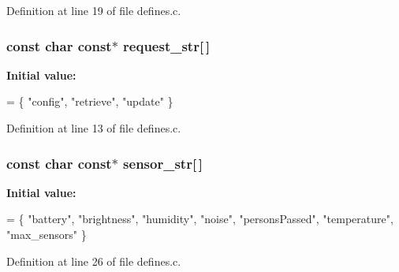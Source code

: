 Definition at line 19 of file defines.\-c.

\subsubsection[{request\-\_\-str}]{\setlength{\rightskip}{0pt plus 5cm}const char const$\ast$ request\-\_\-str[$\,$]}\label{defines_8c_a3a6251b9cae8d7da3cec393b23df3228}
{\bfseries Initial value\-:}
\begin{DoxyCode}
= \{
    \textcolor{stringliteral}{"config"},
    \textcolor{stringliteral}{"retrieve"},
    \textcolor{stringliteral}{"update"}
\}
\end{DoxyCode}


Definition at line 13 of file defines.\-c.

\subsubsection[{sensor\-\_\-str}]{\setlength{\rightskip}{0pt plus 5cm}const char const$\ast$ sensor\-\_\-str[$\,$]}\label{defines_8c_aa1c2df433b41481f1dee5aa6519df290}
{\bfseries Initial value\-:}
\begin{DoxyCode}
= \{
    \textcolor{stringliteral}{"battery"},
    \textcolor{stringliteral}{"brightness"},
    \textcolor{stringliteral}{"humidity"},
    \textcolor{stringliteral}{"noise"},
    \textcolor{stringliteral}{"personsPassed"},
    \textcolor{stringliteral}{"temperature"},
    \textcolor{stringliteral}{"max\_sensors"}
\}
\end{DoxyCode}


Definition at line 26 of file defines.\-c.

